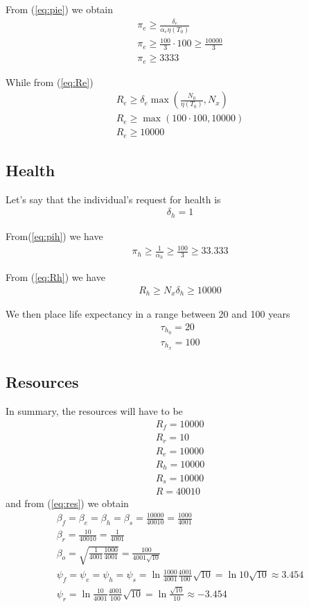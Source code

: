 \documentclass[a4paper,twoside]{article}
\begin{document}
From (\ref{eq:pie}) we obtain
\begin{align*}
	\pi_e \ge \frac{\delta_e}{\alpha_e \eta(T_0)}
	\\
	\pi_e \ge \frac{100}{3} \cdot 100 \ge \frac{10000}{3}
	\\
	\pi_e \ge 3333
\end{align*}

While from (\ref{eq:Re})
\begin{align*}
	R_e \ge \delta_e \max \left( \frac{N_0}{\eta(T_0)}, N_x \right)
	\\
	R_e \ge \max \left( 100 \cdot 100 , 10000 \right)
	\\
	R_e \ge 10000
\end{align*}

\subsection{Health}

Let's say that the individual's request for health is
\begin{align*}
	\delta_h = 1
\end{align*}

From(\ref{eq:pih}) we have
\begin{align*}
	\pi_h \ge \frac{1}{\alpha_h} \ge \frac{100}{3} \ge 33.333
\end{align*}

From (\ref{eq:Rh}) we have
\begin{align*}
	R_h \ge N_x \delta_h \ge 10000
\end{align*}

We then place life expectancy in a range between 20 and 100 years
\begin{align*}
	\tau_{h_0} = 20
	\\
	\tau_{h_x} = 100
\end{align*}

\subsection{Resources}

In summary, the resources will have to be
\begin{align*}
	R_f = 10000
	\\
	R_r = 10
	\\
	R_e = 10000
	\\
	R_h = 10000
	\\
	R_s = 10000
	\\
	R = 40010
\end{align*}
and from (\ref{eq:res}) we obtain
\begin{align*}
	\beta_f = \beta_e = \beta_h = \beta_s = \frac{10000}{40010} = \frac{1000}{4001}
	\\
	\beta_r = \frac{10}{40010} = \frac{1}{4001}
	\\
	\beta_o = \sqrt{\frac{1}{4001} \frac{1000}{4001}}=\frac{100}{4001 \sqrt{10}}
	\\
	\psi_f = \psi_e = \psi_h = \psi_s = \ln \frac{1000}{4001} \frac{4001}{100} \sqrt{10}
	= \ln 10 \sqrt{10} \approx 3.454
	\\
	\psi_r = \ln \frac{10}{4001} \frac{4001}{100} \sqrt{10}
	= \ln \frac{\sqrt{10}}{10} \approx -3.454
\end{align*}
\end{document}
